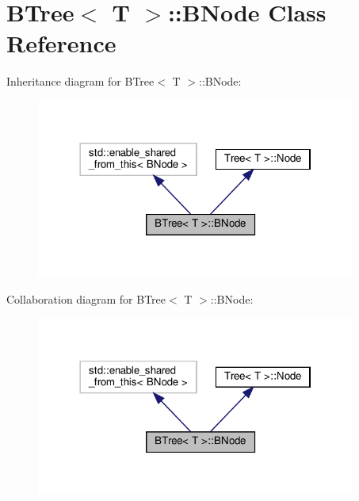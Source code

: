 \hypertarget{classBTree_1_1BNode}{}\section{B\+Tree$<$ T $>$\+:\+:B\+Node Class Reference}
\label{classBTree_1_1BNode}


Inheritance diagram for B\+Tree$<$ T $>$\+:\+:B\+Node\+:
\nopagebreak
\begin{figure}[H]
\begin{center}
\leavevmode
\includegraphics[width=298pt]{classBTree_1_1BNode__inherit__graph}
\end{center}
\end{figure}


Collaboration diagram for B\+Tree$<$ T $>$\+:\+:B\+Node\+:
\nopagebreak
\begin{figure}[H]
\begin{center}
\leavevmode
\includegraphics[width=298pt]{classBTree_1_1BNode__coll__graph}
\end{center}
\end{figure}

